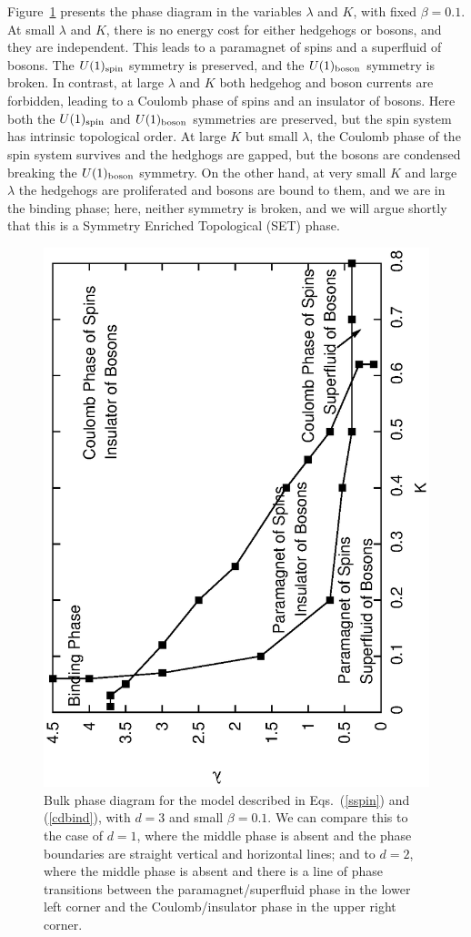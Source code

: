 Figure~\ref{fracphase} presents the phase diagram in the variables $\lambda$ and $K$, with fixed $\beta=0.1$.
At small $\lambda$ and $K$, there is no energy cost for either hedgehogs or bosons, and they are independent. This leads to a paramagnet of spins and a superfluid of bosons. The $U(1)_{\rm spin}$ symmetry is preserved, and the $U(1)_{\rm boson}$ symmetry is broken. In contrast, at large $\lambda$ and $K$ both hedgehog and boson currents are forbidden, leading to a Coulomb phase of spins and an insulator of bosons. Here both the $U(1)_{\rm spin}$ and $U(1)_{\rm boson}$ symmetries are preserved, but the spin system has intrinsic topological order. 
At large $K$ but small $\lambda$, the Coulomb phase of the spin system survives and the hedghogs are gapped, but the bosons are condensed breaking the $U(1)_{\rm boson}$ symmetry.
On the other hand, at very small $K$ and large $\lambda$ the hedgehogs are proliferated and bosons are bound to them, and we are in the binding phase; here, neither symmetry is broken, and we will argue shortly that this is a Symmetry Enriched Topological (SET) phase. 

\begin{figure}
\includegraphics[angle=-90,width=0.9\linewidth]{figures/fracphase3D.eps}
\caption{Bulk phase diagram for the model described in Eqs.~(\ref{sspin}) and (\ref{cdbind}), with $d=3$ and small $\beta=0.1$. We can compare this to the case of $d=1$, where the middle phase is absent and the phase boundaries are straight vertical and horizontal lines; and to $d=2$, where the middle phase is absent and there is a line of phase transitions between the paramagnet/superfluid phase in the lower left corner and the Coulomb/insulator phase in the upper right corner.}
\label{fracphase}
\end{figure}

